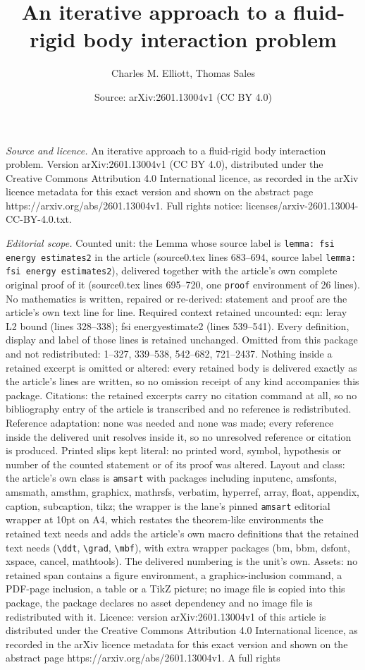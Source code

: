 \documentclass[10pt,a4paper]{amsart}
\title[An iterative approach to a fluid-rigid body interaction prob]{An iterative approach to a fluid-rigid body interaction problem}
\author{Charles M. Elliott, Thomas Sales}
\date{Source: arXiv:2601.13004v1 (CC BY 4.0)}
\begin{document}
\maketitle

\noindent\emph{Source and licence.} An iterative approach to a fluid-rigid body interaction problem. Version arXiv:2601.13004v1 (CC BY 4.0), distributed under the Creative Commons Attribution 4.0 International licence, as recorded in the arXiv licence metadata for this exact version and shown on the abstract page https://arxiv.org/abs/2601.13004v1. Full rights notice: licenses/arxiv-2601.13004-CC-BY-4.0.txt.\par\smallskip

\noindent\textit{Editorial scope.} Counted unit: the Lemma whose source label is \texttt{lemma: fsi energy estimates2} in the article (source0.tex lines 683--694, source label \texttt{lemma: fsi energy estimates2}), delivered together with the article's own complete original proof of it (source0.tex lines 695--720, one \texttt{proof} environment of 26 lines). No mathematics is written, repaired or re-derived: statement and proof are the article's own text line for line. Required context retained uncounted: eqn: leray L2 bound (lines 328--338); fsi energyestimate2 (lines 539--541). Every definition, display and label of those lines is retained unchanged. Omitted from this package and not redistributed: 1--327, 339--538, 542--682, 721--2437. Nothing inside a retained excerpt is omitted or altered: every retained body is delivered exactly as the article's lines are written, so no omission receipt of any kind accompanies this package. Citations: the retained excerpts carry no citation command at all, so no bibliography entry of the article is transcribed and no reference is redistributed. Reference adaptation: none was needed and none was made; every reference inside the delivered unit resolves inside it, so no unresolved reference or citation is produced. Printed slips kept literal: no printed word, symbol, hypothesis or number of the counted statement or of its proof was altered. Layout and class: the article's own class is \texttt{amsart} with packages including inputenc, amsfonts, amsmath, amsthm, graphicx, mathrsfs, verbatim, hyperref, array, float, appendix, caption, subcaption, tikz; the wrapper is the lane's pinned \texttt{amsart} editorial wrapper at 10pt on A4, which restates the theorem-like environments the retained text needs and adds the article's own macro definitions that the retained text needs (\texttt{\textbackslash ddt}, \texttt{\textbackslash grad}, \texttt{\textbackslash mbf}), with extra wrapper packages (bm, bbm, dsfont, xspace, cancel, mathtools). The delivered numbering is the unit's own. Assets: no retained span contains a figure environment, a graphics-inclusion command, a PDF-page inclusion, a table or a TikZ picture; no image file is copied into this package, the package declares no asset dependency and no image file is redistributed with it. Licence: version arXiv:2601.13004v1 of this article is distributed under the Creative Commons Attribution 4.0 International licence, as recorded in the arXiv licence metadata for this exact version and shown on the abstract page https://arxiv.org/abs/2601.13004v1. A full rights 
\end{document}
